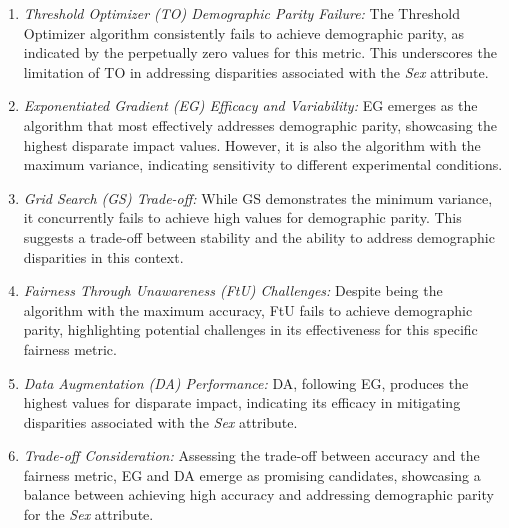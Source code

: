 \begin{enumerate}
    \item \emph{Threshold Optimizer (TO) Demographic Parity Failure:} The Threshold Optimizer algorithm consistently fails to achieve demographic parity, as indicated by the perpetually zero values for this metric. This underscores the limitation of TO in addressing disparities associated with the \emph{Sex} attribute.

    \item \emph{Exponentiated Gradient (EG) Efficacy and Variability:} EG emerges as the algorithm that most effectively addresses demographic parity, showcasing the highest disparate impact values. However, it is also the algorithm with the maximum variance, indicating sensitivity to different experimental conditions.

    \item \emph{Grid Search (GS) Trade-off:} While GS demonstrates the minimum variance, it concurrently fails to achieve high values for demographic parity. This suggests a trade-off between stability and the ability to address demographic disparities in this context.

    \item \emph{Fairness Through Unawareness (FtU) Challenges:} Despite being the algorithm with the maximum accuracy, FtU fails to achieve demographic parity, highlighting potential challenges in its effectiveness for this specific fairness metric.

    \item \emph{Data Augmentation (DA) Performance:} DA, following EG, produces the highest values for disparate impact, indicating its efficacy in mitigating disparities associated with the \emph{Sex} attribute.

    \item \emph{Trade-off Consideration:} Assessing the trade-off between accuracy and the fairness metric, EG and DA emerge as promising candidates, showcasing a balance between achieving high accuracy and addressing demographic parity for the \emph{Sex} attribute.
\end{enumerate}


